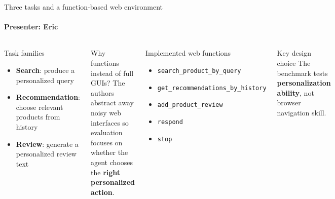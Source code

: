 \documentclass[10pt]{beamer}
\newcommand{\speaker}[1]{\framesubtitle{Presenter: #1}}
\begin{document}
\begin{frame}{Three tasks and a function-based web environment}
  \speaker{Eric}
  \begin{columns}[T,onlytextwidth]
      \begin{block}{Task families}
        \small
        \begin{itemize}
          \item \textbf{Search}: produce a personalized query
          \item \textbf{Recommendation}: choose relevant products from history
          \item \textbf{Review}: generate a personalized review text
        \end{itemize}
      \end{block}
      \begin{block}{Why functions instead of full GUIs?}
        \small
        The authors abstract away noisy web interfaces so evaluation focuses on whether the agent chooses the \textbf{right personalized action}.
      \end{block}
      \begin{block}{Implemented web functions}
        \small
        \begin{itemize}
          \item \texttt{search\_product\_by\_query}
          \item \texttt{get\_recommendations\_by\_history}
          \item \texttt{add\_product\_review}
          \item \texttt{respond}
          \item \texttt{stop}
        \end{itemize}
      \end{block}
      \begin{alertblock}{Key design choice}
        \small The benchmark tests \textbf{personalization ability}, not browser navigation skill.
      \end{alertblock}
  \end{columns}
\end{frame}
\end{document}

